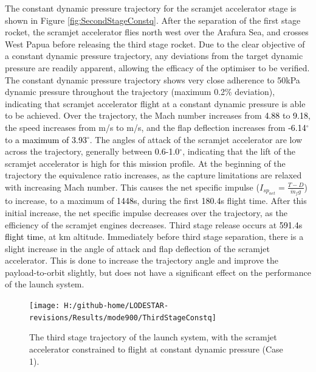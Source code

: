 The constant dynamic pressure trajectory for the scramjet accelerator stage is shown in Figure \ref{fig:SecondStageConstq}. After the separation of the first stage rocket, the scramjet accelerator flies north west over the Arafura Sea, and crosses West Papua before releasing the third stage rocket. Due to the clear objective of a constant dynamic pressure trajectory, any deviations from the target dynamic pressure are readily apparent, allowing the efficacy of the optimiser to be verified. 
The constant dynamic pressure trajectory shows very close adherence to 50kPa dynamic pressure  throughout the trajectory (maximum 0.2\% deviation), indicating that scramjet accelerator flight at a constant dynamic pressure is able to be achieved.  
Over the trajectory, the Mach number increases from \textcolor{black}{4.88} to \textcolor{black}{9.18}, the speed increases from \firstsecondSeparationvConstqNoReturn m/s to \secondthirdSeparationvConstqNoReturn m/s, and the flap deflection increases from \textcolor{black}{-6.14}$^\circ$ to \textcolor{black}{a maximum of 3.93$^\circ$}. The angles of attack of the scramjet accelerator are low across the trajectory, generally between \textcolor{black}{0.6-1.0}$^\circ$, indicating that the lift of the scramjet accelerator is high for this mission profile. At the beginning of the trajectory the equivalence ratio increases, as the capture limitations are relaxed with increasing Mach number. This causes the net specific impulse ($I_{sp_{net}} = \frac{T-D}{\dot{m}_f g}$) to increase, to a maximum of \textcolor{black}{1448s}, during the first \textcolor{black}{180.4}s flight time.  After this initial increase, the net specific impulse decreases over the trajectory, as the efficiency of the scramjet engines decreases. 
Third stage release occurs at \textcolor{black}{591.4s flight time}, at \secondthirdSeparationAltConstqNoReturn km altitude. Immediately before third stage separation, there is a slight increase in the angle of attack and flap deflection of the scramjet accelerator. This is done to increase the trajectory angle and improve the payload-to-orbit slightly, but does not have a significant effect on the performance of the launch system. 

\begin{figure}[ht!]%
\centering
\texttt{[image: H:/github-home/LODESTAR-revisions/Results/mode900/ThirdStageConstq]}
\caption{The third stage trajectory of the launch system, with the scramjet accelerator constrained to flight at constant dynamic pressure (Case 1).}
\label{fig:ThirdStageConstq}
\end{figure}


